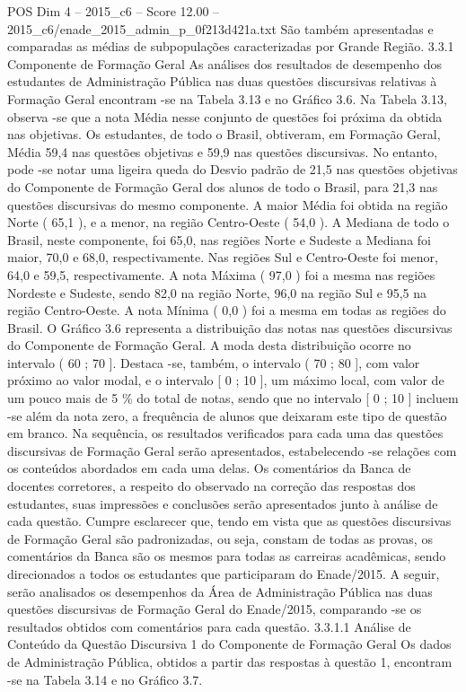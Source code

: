 \begin{textsample}{POS Dim 4 – 2015\_c6 – Score 12.00 – 2015\_c6/enade\_2015\_admin\_p\_0f213d421a.txt}
São também apresentadas e comparadas as médias de subpopulações caracterizadas por Grande Região. 3.3.1 Componente de Formação Geral As análises dos resultados de desempenho dos estudantes de Administração Pública nas duas questões discursivas relativas à Formação Geral encontram -se na Tabela 3.13 e no Gráfico 3.6.
Na Tabela 3.13, observa -se que a nota Média nesse conjunto de questões foi próxima da obtida nas objetivas.
Os estudantes, de todo o Brasil, obtiveram, em Formação Geral, Média 59,4 nas questões objetivas e 59,9 nas questões discursivas.
No entanto, pode -se notar uma ligeira queda do Desvio padrão de 21,5 nas questões objetivas do Componente de Formação Geral dos alunos de todo o Brasil, para 21,3 nas questões discursivas do mesmo componente.
A maior Média foi obtida na região Norte ( 65,1 ), e a menor, na região Centro-Oeste ( 54,0 ).
A Mediana de todo o Brasil, neste componente, foi 65,0, nas regiões Norte e Sudeste a Mediana foi maior, 70,0 e 68,0, respectivamente.
Nas regiões Sul e Centro-Oeste foi menor, 64,0 e 59,5, respectivamente.
A nota Máxima ( 97,0 ) foi a mesma nas regiões Nordeste e Sudeste, sendo 82,0 na região Norte, 96,0 na região Sul e 95,5 na região Centro-Oeste.
A nota Mínima ( 0,0 ) foi a mesma em todas as regiões do Brasil.
O Gráfico 3.6 representa a distribuição das notas nas questões discursivas do Componente de Formação Geral.
A moda desta distribuição ocorre no intervalo ( 60 ; 70 ].
Destaca -se, também, o intervalo ( 70 ; 80 ], com valor próximo ao valor modal, e o intervalo [ 0 ; 10 ], um máximo local, com valor de um pouco mais de 5 \% do total de notas, sendo que no intervalo [ 0 ; 10 ] incluem -se além da nota zero, a frequência de alunos que deixaram este tipo de questão em branco.
Na sequência, os resultados verificados para cada uma das questões discursivas de Formação Geral serão apresentados, estabelecendo -se relações com os conteúdos abordados em cada uma delas.
Os comentários da Banca de docentes corretores, a respeito do observado na correção das respostas dos estudantes, suas impressões e conclusões serão apresentados junto à análise de cada questão.
Cumpre esclarecer que, tendo em vista que as questões discursivas de Formação Geral são padronizadas, ou seja, constam de todas as provas, os comentários da Banca são os mesmos para todas as carreiras acadêmicas, sendo direcionados a todos os estudantes que participaram do Enade/2015.
A seguir, serão analisados os desempenhos da Área de Administração Pública nas duas questões discursivas de Formação Geral do Enade/2015, comparando -se os resultados obtidos com comentários para cada questão. 3.3.1.1 Análise de Conteúdo da Questão Discursiva 1 do Componente de Formação Geral Os dados de Administração Pública, obtidos a partir das respostas à questão 1, encontram -se na Tabela 3.14 e no Gráfico 3.7.

\end{textsample}
